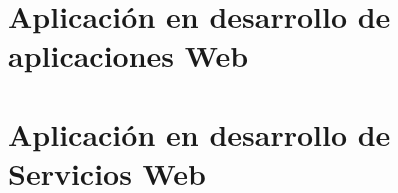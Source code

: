 \section{Aplicación en desarrollo de aplicaciones Web} 


\section{Aplicación en desarrollo de Servicios Web} 

